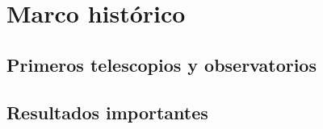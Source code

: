 \chapter{Marco histórico}\label{ch:MarcoHistorico1}

\section{Primeros telescopios y observatorios}

\section{Resultados importantes}
